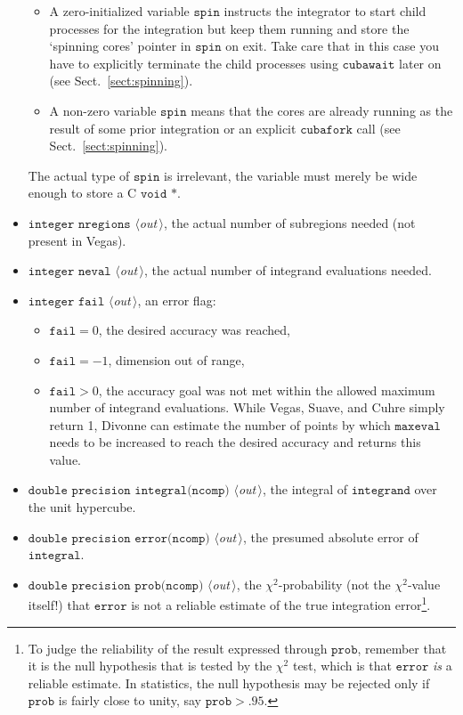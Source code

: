 \documentclass[12pt]{article}
\newcommand\Code[1]{\ensuremath{\texttt{#1}}}
\newcommand\VarOut[1]{\item\Code{#1} \textit{$\langle$out\,$\rangle$},}
\begin{document}
\begin{itemize}
\begin{itemize}
\item A zero-initialized variable \Code{spin} instructs the integrator 
to start child processes for the integration but keep them running and 
store the `spinning cores' pointer in \Code{spin} on exit.  Take care 
that in this case you have to explicitly terminate the child processes 
using \Code{cubawait} later on (see Sect.~\ref{sect:spinning}).

\item A non-zero variable \Code{spin} means that the cores are already 
running as the result of some prior integration or an explicit 
\Code{cubafork} call (see Sect.~\ref{sect:spinning}).
\end{itemize}
The actual type of \Code{spin} is irrelevant, the variable must merely
be wide enough to store a C \Code{void *}.

\VarOut{integer nregions}
the actual number of subregions needed (not present in Vegas).

\VarOut{integer neval}
the actual number of integrand evaluations needed.

\VarOut{integer fail}
an error flag:
\begin{itemize}
\item
$\Code{fail} = 0$, the desired accuracy was reached,
\item
$\Code{fail} = -1$, dimension out of range,
\item
$\Code{fail} > 0$, the accuracy goal was not met within the allowed
maximum number of integrand evaluations.  While Vegas, Suave, and Cuhre
simply return 1, Divonne can estimate the number of points by which
\Code{maxeval} needs to be increased to reach the desired accuracy and
returns this value.
\end{itemize}

\VarOut{double precision integral(ncomp)}
the integral of \Code{integrand} over the unit hypercube.

\VarOut{double precision error(ncomp)}
the presumed absolute error of \Code{integral}.

\VarOut{double precision prob(ncomp)}
the $\chi^2$-probability (not the $\chi^2$-value itself!) that
\Code{error} is not a reliable estimate of the true integration 
error\footnote{%
	To judge the reliability of the result expressed through
	\Code{prob}, remember that it is the null hypothesis that is 
	tested by the $\chi^2$ test, which is that \Code{error} 
	\emph{is} a reliable estimate.  In statistics, the null 
	hypothesis may be rejected only if \Code{prob} is fairly close 
	to unity, say $\Code{prob} > .95$.}.
\end{itemize}
\end{document}
